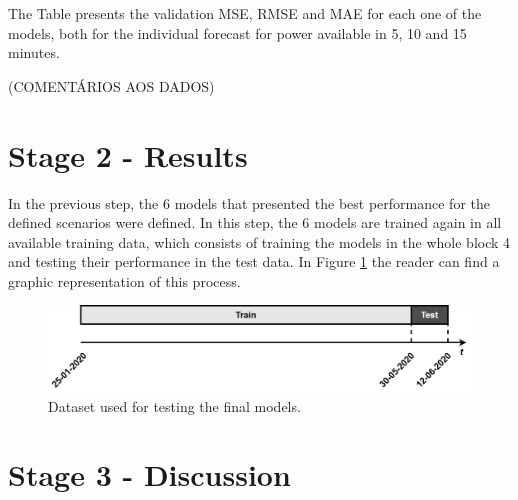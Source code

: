 The Table presents the validation \ac{MSE}, \ac{RMSE} and \ac{MAE} for each one of the models, both for the individual forecast for power available in 5, 10 and 15 minutes.



(COMENTÁRIOS AOS DADOS)

\section{Stage 2 - Results}\label{chap3:section:stage_2}

In the previous step, the 6 models that presented the best performance for the defined scenarios were defined. In this step, the 6 models are trained again in all available training data, which consists of training the models in the whole block 4 and testing their performance in the test data. In Figure \ref{test} the reader can find a graphic representation of this process.

\begin{figure}[h!]
    \centering
    \begin{center}
    \includegraphics[width=1\textwidth]{Images/test2.png}
    \caption{Dataset used for testing the final models.}
    \label{test}
    \end{center}
\end{figure}


\section{Stage 3 - Discussion}\label{chap3:section:stage_3}